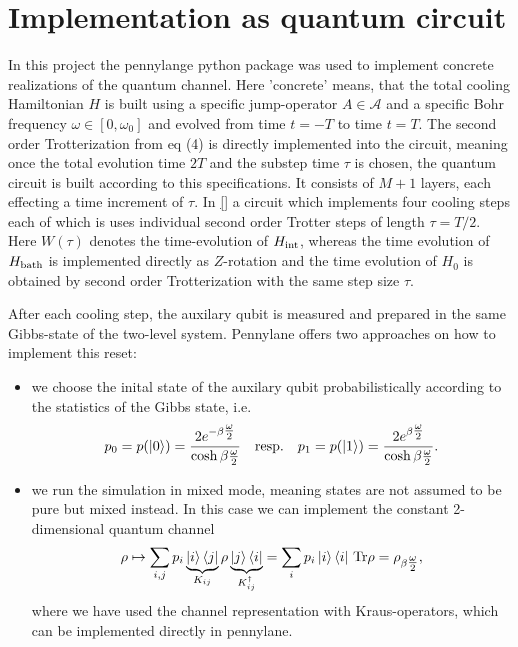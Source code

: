 \documentclass[11pt,a4paper]{article}
\begin{document}
\section{Implementation as quantum circuit}
In this project the pennylange python package was used to implement concrete realizations of the quantum channel. Here 'concrete' means, that the total cooling Hamiltonian $H$ is built using a specific jump-operator $A\in \mathcal{A}$ and a specific Bohr frequency $\omega\in [0, \omega_0]$ and evolved from time $t=-T$ to time $t=T$. The second order Trotterization from eq (4) is directly implemented into the circuit, meaning
once the total evolution time $2T$ and the substep time $\tau$ is chosen, the quantum circuit is built according to this specifications. It consists of $M+1$ layers, each effecting a time increment of $\tau$. In \autoref{}
a circuit which implements four cooling steps each of which is uses individual second order Trotter steps of length $\tau = T/2$. Here $W(\tau)$ denotes the time-evolution of $H_{\rm int}$, whereas the time evolution of $H_{\rm bath}$ is implemented directly as $Z$-rotation and the time evolution of $H_0$ is obtained by second order Trotterization with the same step size $\tau$.

After each cooling step, the auxilary qubit is measured and prepared in the same Gibbs-state of the two-level system. Pennylane offers two approaches on how to implement this reset:

\begin{itemize}
    \item we choose the inital state of the auxilary qubit probabilistically according to the statistics of the Gibbs state, i.e. 
    \begin{align}
        p_0=p(\ket{0}) = \frac{2 e^{-\beta \tfrac{\omega}{2}}}{\cosh{\beta \tfrac{\omega}{2}}} \quad\mbox{resp.}\quad p_1=p(\ket{1}) = \frac{2 e^{\beta \tfrac{\omega}{2}}}{\cosh{\beta \tfrac{\omega}{2}}}.
    \end{align}
    \item we run the simulation in mixed mode, meaning states are not assumed to be pure but mixed instead. In this case we can implement the constant 2-dimensional quantum channel 
    \begin{align*}
        \rho \mapsto \sum_{i,j} p_i \underbrace{\ket{i}\bra{j}}_{K_{ij}} \rho \underbrace{\ket{j}\bra{i}}_{K_{ij}^{\dagger}} = \sum_{i} p_i \ket{i}\bra{i}\, \rm{Tr}\rho = \rho_{\beta \tfrac{\omega}{2}},
    \end{align*} where we have used the channel representation with Kraus-operators, which can be implemented directly in pennylane.
\end{itemize}
\end{document}
